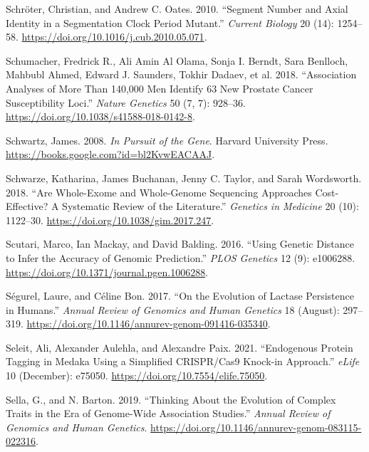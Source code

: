 \documentclass[
]{book}
\newlength{\cslhangindent}
\newlength{\cslentryspacingunit} %
\newenvironment{CSLReferences}[2] %
 {%
  \setlength{\parindent}{0pt}
  \ifodd #1
  \let\oldpar\par
  \def\par{\hangindent=\cslhangindent\oldpar}
  \fi
  \setlength{\parskip}{#2\cslentryspacingunit}
 }%
 {}
\begin{document}
\begin{CSLReferences}{1}{0}
\leavevmode{}%
Schröter, Christian, and Andrew C. Oates. 2010. {``Segment {Number} and {Axial Identity} in a {Segmentation Clock Period Mutant}.''} \emph{Current Biology} 20 (14): 1254--58. \url{https://doi.org/10.1016/j.cub.2010.05.071}.

\leavevmode{}%
Schumacher, Fredrick R., Ali Amin Al Olama, Sonja I. Berndt, Sara Benlloch, Mahbubl Ahmed, Edward J. Saunders, Tokhir Dadaev, et al. 2018. {``Association Analyses of More Than 140,000 Men Identify 63 New Prostate Cancer Susceptibility Loci.''} \emph{Nature Genetics} 50 (7, 7): 928--36. \url{https://doi.org/10.1038/s41588-018-0142-8}.

\leavevmode{}%
Schwartz, James. 2008. \emph{In {Pursuit} of the {Gene}}. {Harvard University Press}. \url{https://books.google.com?id=bl2KvwEACAAJ}.

\leavevmode{}%
Schwarze, Katharina, James Buchanan, Jenny C. Taylor, and Sarah Wordsworth. 2018. {``Are Whole-Exome and Whole-Genome Sequencing Approaches Cost-Effective? {A} Systematic Review of the Literature.''} \emph{Genetics in Medicine} 20 (10): 1122--30. \url{https://doi.org/10.1038/gim.2017.247}.

\leavevmode{}%
Scutari, Marco, Ian Mackay, and David Balding. 2016. {``Using {Genetic Distance} to {Infer} the {Accuracy} of {Genomic Prediction}.''} \emph{PLOS Genetics} 12 (9): e1006288. \url{https://doi.org/10.1371/journal.pgen.1006288}.

\leavevmode{}%
Ségurel, Laure, and Céline Bon. 2017. {``On the {Evolution} of {Lactase Persistence} in {Humans}.''} \emph{Annual Review of Genomics and Human Genetics} 18 (August): 297--319. \url{https://doi.org/10.1146/annurev-genom-091416-035340}.

\leavevmode{}%
Seleit, Ali, Alexander Aulehla, and Alexandre Paix. 2021. {``Endogenous Protein Tagging in Medaka Using a Simplified {CRISPR}/{Cas9} Knock-in Approach.''} \emph{eLife} 10 (December): e75050. \url{https://doi.org/10.7554/elife.75050}.

\leavevmode{}%
Sella, G., and N. Barton. 2019. {``Thinking {About} the {Evolution} of {Complex Traits} in the {Era} of {Genome-Wide Association Studies}.''} \emph{Annual Review of Genomics and Human Genetics}. \url{https://doi.org/10.1146/annurev-genom-083115-022316}.


\end{CSLReferences}
\end{document}
